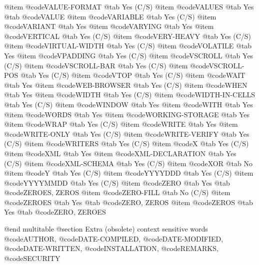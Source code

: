 @item @code{VALUE-FORMAT} @tab Yes (C/S)
@item @code{VALUES} @tab Yes @tab @code{VALUE}
@item @code{VARIABLE} @tab Yes (C/S)
@item @code{VARIANT} @tab Yes
@item @code{VARYING} @tab Yes
@item @code{VERTICAL} @tab Yes (C/S)
@item @code{VERY-HEAVY} @tab Yes (C/S)
@item @code{VIRTUAL-WIDTH} @tab Yes (C/S)
@item @code{VOLATILE} @tab Yes
@item @code{VPADDING} @tab Yes (C/S)
@item @code{VSCROLL} @tab Yes (C/S)
@item @code{VSCROLL-BAR} @tab Yes (C/S)
@item @code{VSCROLL-POS} @tab Yes (C/S)
@item @code{VTOP} @tab Yes (C/S)
@item @code{WAIT} @tab Yes
@item @code{WEB-BROWSER} @tab Yes (C/S)
@item @code{WHEN} @tab Yes
@item @code{WIDTH} @tab Yes (C/S)
@item @code{WIDTH-IN-CELLS} @tab Yes (C/S)
@item @code{WINDOW} @tab Yes
@item @code{WITH} @tab Yes
@item @code{WORDS} @tab Yes
@item @code{WORKING-STORAGE} @tab Yes
@item @code{WRAP} @tab Yes (C/S)
@item @code{WRITE} @tab Yes
@item @code{WRITE-ONLY} @tab Yes (C/S)
@item @code{WRITE-VERIFY} @tab Yes (C/S)
@item @code{WRITERS} @tab Yes (C/S)
@item @code{X} @tab Yes (C/S)
@item @code{XML} @tab Yes
@item @code{XML-DECLARATION} @tab Yes (C/S)
@item @code{XML-SCHEMA} @tab Yes (C/S)
@item @code{XOR} @tab No
@item @code{Y} @tab Yes (C/S)
@item @code{YYYYDDD} @tab Yes (C/S)
@item @code{YYYYMMDD} @tab Yes (C/S)
@item @code{ZERO} @tab Yes @tab @code{ZEROES, ZEROS}
@item @code{ZERO-FILL} @tab No (C/S)
@item @code{ZEROES} @tab Yes @tab @code{ZERO, ZEROS}
@item @code{ZEROS} @tab Yes @tab @code{ZERO, ZEROES}


@end multitable
@section Extra (obsolete) context sensitive words
@code{AUTHOR}, @code{DATE-COMPILED}, @code{DATE-MODIFIED}, @code{DATE-WRITTEN}, @code{INSTALLATION}, @code{REMARKS}, @code{SECURITY}


